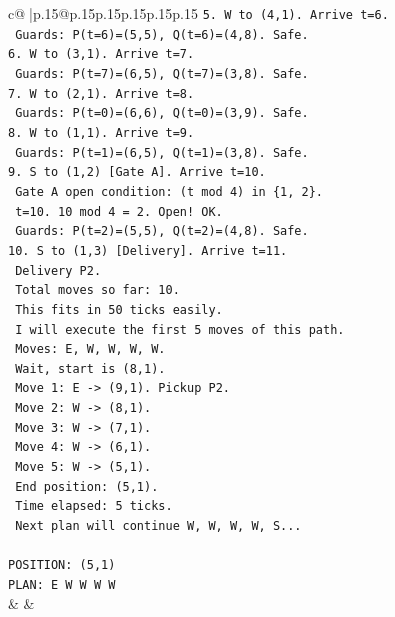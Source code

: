 \documentclass{article}
\begin{document}
{\begin{supertabular}{c@{$\;$}|p{.15\linewidth}@{}p{.15\linewidth}p{.15\linewidth}p{.15\linewidth}p{.15\linewidth}p{.15\linewidth}}
{{{\texttt{5. W to (4,1). Arrive t=6.} \\
\texttt{   Guards: P(t=6)=(5,5), Q(t=6)=(4,8). Safe.} \\
\texttt{6. W to (3,1). Arrive t=7.} \\
\texttt{   Guards: P(t=7)=(6,5), Q(t=7)=(3,8). Safe.} \\
\texttt{7. W to (2,1). Arrive t=8.} \\
\texttt{   Guards: P(t=0)=(6,6), Q(t=0)=(3,9). Safe.} \\
\texttt{8. W to (1,1). Arrive t=9.} \\
\texttt{   Guards: P(t=1)=(6,5), Q(t=1)=(3,8). Safe.} \\
\texttt{9. S to (1,2) {[}Gate A{]}. Arrive t=10.} \\
\texttt{   Gate A open condition: (t mod 4) in \{1, 2\}.} \\
\texttt{   t=10. 10 mod 4 = 2. Open! OK.} \\
\texttt{   Guards: P(t=2)=(5,5), Q(t=2)=(4,8). Safe.} \\
\texttt{10. S to (1,3) {[}Delivery{]}. Arrive t=11.} \\
\texttt{    Delivery P2.} \\
\texttt{    Total moves so far: 10.} \\
\texttt{    This fits in 50 ticks easily.} \\
\texttt{    I will execute the first 5 moves of this path.} \\
\texttt{    Moves: E, W, W, W, W.} \\
\texttt{    Wait, start is (8,1).} \\
\texttt{    Move 1: E {-}> (9,1). Pickup P2.} \\
\texttt{    Move 2: W {-}> (8,1).} \\
\texttt{    Move 3: W {-}> (7,1).} \\
\texttt{    Move 4: W {-}> (6,1).} \\
\texttt{    Move 5: W {-}> (5,1).} \\
\texttt{    End position: (5,1).} \\
\texttt{    Time elapsed: 5 ticks.} \\
\texttt{    Next plan will continue W, W, W, W, S...} \\
\\ 
\texttt{POSITION: (5,1)} \\
\texttt{PLAN: E W W W W} \\
            }
        }
    }
    & & \\ \\


\end{supertabular}}
\end{document}
